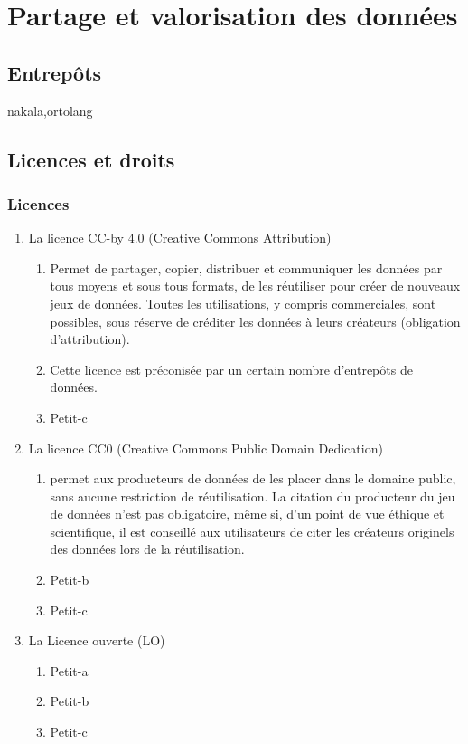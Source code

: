 \documentclass{book}
\begin{document}
\chapter{Partage et valorisation des données}


\section{Entrepôts}
\gls{nakala},\gls{ortolang}
	
\section{Licences et droits}

\subsection{Licences}\label{licences}
\begin{enumerate}
	\item La licence CC-by 4.0 (Creative Commons Attribution)\label{cca}
        \begin{enumerate}
            \item Permet de partager, copier, distribuer et communiquer les données par tous moyens et sous tous formats, de les réutiliser pour créer de nouveaux jeux de données. Toutes les utilisations, y compris commerciales, sont possibles, sous réserve de créditer les données à leurs créateurs (obligation d’attribution).
            \item Cette licence est préconisée par un certain nombre d’entrepôts de données.
            \item Petit-c
        \end{enumerate}
	\item La licence CC0 (Creative Commons Public Domain Dedication)\label{cczero}
        \begin{enumerate}
            \item permet aux producteurs de données de les placer dans le domaine public, sans aucune restriction de réutilisation.
            La citation du producteur du jeu de données n’est pas obligatoire, même si, d’un point de vue éthique et scientifique, il est conseillé aux utilisateurs de citer les créateurs originels des données lors de la réutilisation.
            \item Petit-b
            \item Petit-c
        \end{enumerate}
	\item La Licence ouverte (LO)
        \begin{enumerate}
            \item Petit-a
            \item Petit-b
            \item Petit-c
        \end{enumerate}
\end{enumerate}
\end{document}
